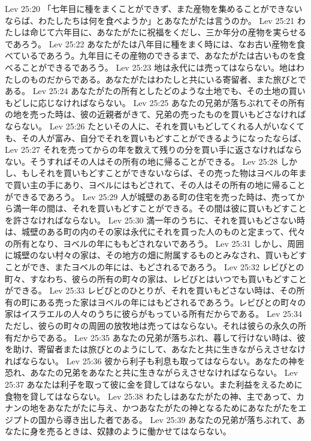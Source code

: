 Lev 25:20  「七年目に種をまくことができず、また産物を集めることができないならば、わたしたちは何を食べようか」とあなたがたは言うのか。
Lev 25:21  わたしは命じて六年目に、あなたがたに祝福をくだし、三か年分の産物を実らせるであろう。
Lev 25:22  あなたがたは八年目に種をまく時には、なお古い産物を食べているであろう。九年目にその産物のできるまで、あなたがたは古いものを食べることができるであろう。
Lev 25:23  地は永代には売ってはならない。地はわたしのものだからである。あなたがたはわたしと共にいる寄留者、また旅びとである。
Lev 25:24  あなたがたの所有としたどのような土地でも、その土地の買いもどしに応じなければならない。
Lev 25:25  あなたの兄弟が落ちぶれてその所有の地を売った時は、彼の近親者がきて、兄弟の売ったものを買いもどさなければならない。
Lev 25:26  たといその人に、それを買いもどしてくれる人がいなくても、その人が富み、自分でそれを買いもどすことができるようになったならば、
Lev 25:27  それを売ってからの年を数えて残りの分を買い手に返さなければならない。そうすればその人はその所有の地に帰ることができる。
Lev 25:28  しかし、もしそれを買いもどすことができないならば、その売った物はヨベルの年まで買い主の手にあり、ヨベルにはもどされて、その人はその所有の地に帰ることができるであろう。
Lev 25:29  人が城壁のある町の住宅を売った時は、売ってから満一年の間は、それを買いもどすことができる。その間は彼に買いもどすことを許さなければならない。
Lev 25:30  満一年のうちに、それを買いもどさない時は、城壁のある町の内のその家は永代にそれを買った人のものと定まって、代々の所有となり、ヨベルの年にももどされないであろう。
Lev 25:31  しかし、周囲に城壁のない村々の家は、その地方の畑に附属するものとみなされ、買いもどすことができ、またヨベルの年には、もどされるであろう。
Lev 25:32  レビびとの町々、すなわち、彼らの所有の町々の家は、レビびとはいつでも買いもどすことができる。
Lev 25:33  レビびとのひとりが、それを買いもどさない時は、その所有の町にある売った家はヨベルの年にはもどされるであろう。レビびとの町々の家はイスラエルの人々のうちに彼らがもっている所有だからである。
Lev 25:34  ただし、彼らの町々の周囲の放牧地は売ってはならない。それは彼らの永久の所有だからである。
Lev 25:35  あなたの兄弟が落ちぶれ、暮して行けない時は、彼を助け、寄留者または旅びとのようにして、あなたと共に生きながらえさせなければならない。
Lev 25:36  彼から利子も利息も取ってはならない。あなたの神を恐れ、あなたの兄弟をあなたと共に生きながらえさせなければならない。
Lev 25:37  あなたは利子を取って彼に金を貸してはならない。また利益をえるために食物を貸してはならない。
Lev 25:38  わたしはあなたがたの神、主であって、カナンの地をあなたがたに与え、かつあなたがたの神となるためにあなたがたをエジプトの国から導き出した者である。
Lev 25:39  あなたの兄弟が落ちぶれて、あなたに身を売るときは、奴隷のように働かせてはならない。
